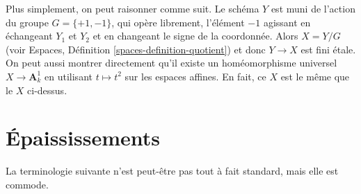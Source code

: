 \begin{remark}
\medskip\noindent
Plus simplement, on peut raisonner comme suit. Le schéma $Y$ est muni de l'action du groupe
$G = \{+1, -1\}$, qui opère librement, l'élément $-1$ agissant en échangeant
$Y_1$ et $Y_2$ et en changeant le signe de la coordonnée. Alors
$X = Y/G$ (voir Espaces, Définition \ref{spaces-definition-quotient})
et donc $Y \to X$ est fini étale. On peut aussi montrer directement
qu'il existe un homéomorphisme universel $X \to \mathbf{A}^1_k$
en utilisant $t \mapsto t^2$ sur les espaces affines. En fait, ce $X$ est
le même que le $X$ ci-dessus.
\end{remark}








\section{Épaississements}
\label{section-thickenings}

\noindent
La terminologie suivante n'est peut-être pas tout à fait standard, mais elle est commode.

